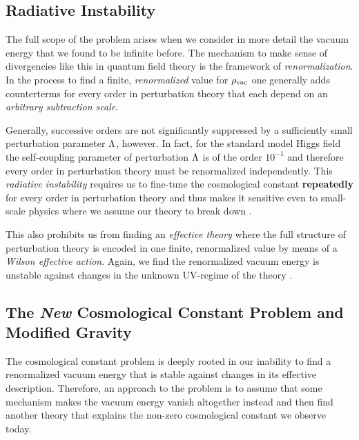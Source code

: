 \documentclass[12pt,parskip=half]{scrreprt}
\newcommand{\addref}{\todo[color=black!20]{ref.}}
\begin{document}
\subsection{Radiative Instability}\label{sec:rad_instability}

The full scope of the problem arises when we consider in more detail the vacuum energy that we found to be infinite before. The mechanism to make sense of divergencies like this in quantum field theory is the framework of \emph{renormalization}. In the process to find a finite, \emph{renormalized} value for \(\rho_\textnormal{vac}\) one generally adds counterterms for every order in perturbation theory that each depend on an \emph{arbitrary subtraction scale}.

Generally, successive orders are not significantly suppressed by a sufficiently small perturbation parameter \(\Lambda\), however. In fact, for the standard model Higgs field the self-coupling parameter of perturbation \(\Lambda\) is of the order \(10^{-1}\) \addref and therefore every order in perturbation theory must be renormalized independently. This \emph{radiative instability} requires us to fine-tune the cosmological constant \textbf{repeatedly} for every order in perturbation theory and thus makes it sensitive even to small-scale physics where we assume our theory to break down \citep{Datta1996}.

This also prohibits us from finding an \emph{effective theory} where the full structure of perturbation theory is encoded in one finite, renormalized value by means of a \emph{Wilson effective action}. \addref Again, we find the renormalized vacuum energy is unstable against changes in the unknown UV-regime of the theory \citep{Datta1996}.


\subsection{The \emph{New} Cosmological Constant Problem and Modified Gravity}\label{sec:cc_problem_new}

The cosmological constant problem is deeply rooted in our inability to find a renormalized vacuum energy that is stable against changes in its effective description. Therefore, an approach to the problem is to assume that some mechanism makes the vacuum energy vanish altogether instead and then find another theory that explains the non-zero cosmological constant we observe today.
\end{document}
